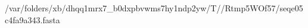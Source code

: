 \documentclass[10pt]{article}
\begin{document}
\begin{texshade}{/var/folders/xb/dhqq1mrx7_b0dxpbvwms7hy1ndp2yw/T//Rtmp5WOf57/seqe05c4fa9a343.fasta}
\hideconsensus
{}
\hidelogoscale
{}
\showlegend
\end{texshade}
\end{document}
